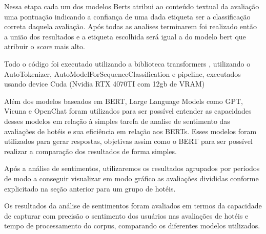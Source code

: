 Nessa etapa cada um dos modelos Berts atribui ao conteúdo textual da avaliação uma pontuação indicando a confiança de uma dada etiqueta ser a classificação correta daquela avaliação. Após todas as analises terminarem foi realizado então a união dos resultados e a etiqueta escolhida será igual a do modelo bert que atribuir o \emph{score} mais alto.

Todo o código foi executado utilizando a biblioteca transformers \cite{Wolf_Transformers_State-of-the-Art_Natural_2020}, utilizando o AutoTokenizer, AutoModelForSequenceClassification e pipeline, executados usando device Cuda (Nvidia RTX 4070TI com 12gb de VRAM) %


Além dos modelos baseados em BERT, Large Language Models como GPT, Vicuna e OpenChat foram utilizados para ser possível entender as capacidades desses modelos em relação à simples tarefa de analise de sentimento das avaliações de hotéis e sua eficiência em relação aos BERTs. Esses modelos foram utilizados para gerar respostas, objetivas assim como o BERT para ser possível realizar a comparação dos resultados de forma simples.





Após a análise de sentimentos, utilizaremos os resultados agrupados por períodos de modo a conseguir visualizar em modo gráfico as avaliações divididas conforme explicitado na seção anterior para um grupo de hotéis.

Os resultados da análise de sentimentos foram avaliados em termos da capacidade de capturar com precisão o sentimento dos usuários nas avaliações de hotéis e tempo de processamento do corpus, comparando os diferentes modelos utilizados.

